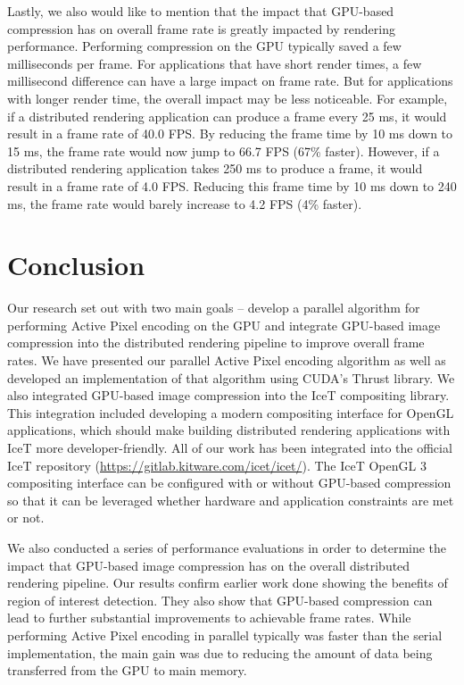 \documentclass{vgtc}                          %
\begin{document}
Lastly, we also would like to mention that the impact that GPU-based compression has on overall frame rate is greatly impacted by rendering performance. Performing compression on the GPU typically saved a few milliseconds per frame. For applications that have short render times, a few millisecond difference can have a large impact on frame rate. But for applications with longer render time, the overall impact may be less noticeable. For example, if a distributed rendering application can produce a frame every 25 ms, it would result in a frame rate of 40.0 FPS. By reducing the frame time by 10 ms down to 15 ms, the frame rate would now jump to 66.7 FPS (67\% faster). However, if a distributed rendering application takes 250 ms to produce a frame, it would result in a frame rate of 4.0 FPS. Reducing this frame time by 10 ms down to 240 ms, the frame rate would barely increase to 4.2 FPS (4\% faster).


\section{Conclusion}
Our research set out with two main goals -- develop a parallel algorithm for performing Active Pixel encoding on the GPU and integrate GPU-based image compression into the distributed rendering pipeline to improve overall frame rates. We have presented our parallel Active Pixel encoding algorithm as well as developed an implementation of that algorithm using CUDA's Thrust library. We also integrated GPU-based image compression into the IceT compositing library. This integration included developing a modern compositing interface for OpenGL applications, which should make building distributed rendering applications with IceT more developer-friendly. All of our work has been integrated into the official IceT repository (\url{https://gitlab.kitware.com/icet/icet/}). The IceT OpenGL 3 compositing interface can be configured with or without GPU-based compression so that it can be leveraged whether hardware and application constraints are met or not.

We also conducted a series of performance evaluations in order to determine the impact that GPU-based image compression has on the overall distributed rendering pipeline. Our results confirm earlier work done showing the benefits of region of interest detection. They also show that GPU-based compression can lead to further substantial improvements to achievable frame rates. While performing Active Pixel encoding in parallel typically was faster than the serial implementation, the main gain was due to reducing the amount of data being transferred from the GPU to main memory.
 
\end{document}
